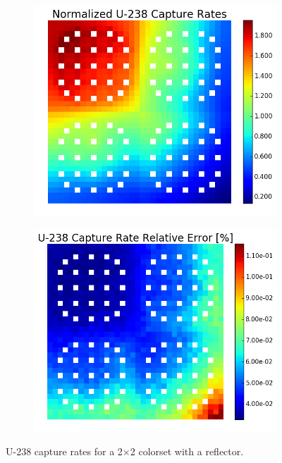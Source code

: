 \begin{figure}[h!]
\centering
\begin{subfigure}{0.44\textwidth}
  \centering
  \includegraphics[width=\linewidth]{figures/benchmarks/capture-rates/capt-mean-reflector}
  \caption{}
  \label{fig:chap7-capt-rate-mean-reflector}
\end{subfigure}%
\begin{subfigure}{0.44\textwidth}
  \centering
  \includegraphics[width=\linewidth]{figures/benchmarks/capture-rates/capt-rel-err-reflector}
  \caption{}
  \label{fig:chap7-capt-rate-rel-err-reflector}
\end{subfigure}%
\caption[U-238 capture rates for a 2$\times$2 colorset with a reflector]{U-238 capture rates for a 2$\times$2 colorset with a reflector.}
\label{fig:chap7-capt-rates-reflector}
\end{figure}

